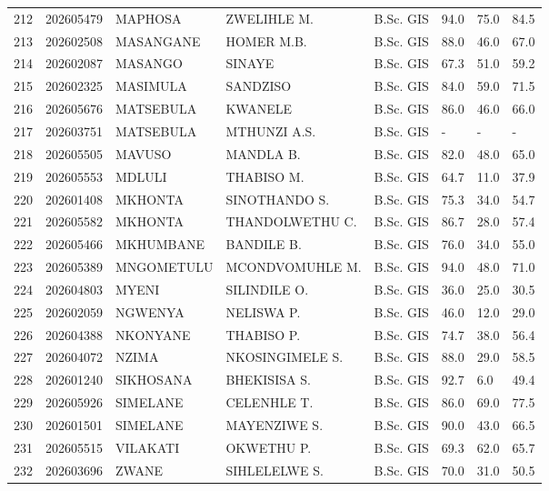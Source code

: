 \documentclass[12pt]{article}
\begin{document}
\begin{longtable}{@{}llllllll@{}}
212 & 202605479 & MAPHOSA & ZWELIHLE M. & B.Sc. GIS & 94.0 & 75.0 & 84.5 \\
213 & 202602508 & MASANGANE & HOMER M.B. & B.Sc. GIS & 88.0 & 46.0 & 67.0 \\
214 & 202602087 & MASANGO & SINAYE & B.Sc. GIS & 67.3 & 51.0 & 59.2 \\
215 & 202602325 & MASIMULA & SANDZISO & B.Sc. GIS & 84.0 & 59.0 & 71.5 \\
216 & 202605676 & MATSEBULA & KWANELE & B.Sc. GIS & 86.0 & 46.0 & 66.0 \\
217 & 202603751 & MATSEBULA & MTHUNZI A.S. & B.Sc. GIS & - & - & - \\
218 & 202605505 & MAVUSO & MANDLA B. & B.Sc. GIS & 82.0 & 48.0 & 65.0 \\
219 & 202605553 & MDLULI & THABISO M. & B.Sc. GIS & 64.7 & 11.0 & 37.9 \\
220 & 202601408 & MKHONTA & SINOTHANDO S. & B.Sc. GIS & 75.3 & 34.0 & 54.7 \\
221 & 202605582 & MKHONTA & THANDOLWETHU C. & B.Sc. GIS & 86.7 & 28.0 & 57.4 \\
222 & 202605466 & MKHUMBANE & BANDILE B. & B.Sc. GIS & 76.0 & 34.0 & 55.0 \\
223 & 202605389 & MNGOMETULU & MCONDVOMUHLE M. & B.Sc. GIS & 94.0 & 48.0 & 71.0 \\
224 & 202604803 & MYENI & SILINDILE O. & B.Sc. GIS & 36.0 & 25.0 & 30.5 \\
225 & 202602059 & NGWENYA & NELISWA P. & B.Sc. GIS & 46.0 & 12.0 & 29.0 \\
226 & 202604388 & NKONYANE & THABISO P. & B.Sc. GIS & 74.7 & 38.0 & 56.4 \\
227 & 202604072 & NZIMA & NKOSINGIMELE S. & B.Sc. GIS & 88.0 & 29.0 & 58.5 \\
228 & 202601240 & SIKHOSANA & BHEKISISA S. & B.Sc. GIS & 92.7 & 6.0 & 49.4 \\
229 & 202605926 & SIMELANE & CELENHLE T. & B.Sc. GIS & 86.0 & 69.0 & 77.5 \\
230 & 202601501 & SIMELANE & MAYENZIWE S. & B.Sc. GIS & 90.0 & 43.0 & 66.5 \\
231 & 202605515 & VILAKATI & OKWETHU P. & B.Sc. GIS & 69.3 & 62.0 & 65.7 \\
232 & 202603696 & ZWANE & SIHLELELWE S. & B.Sc. GIS & 70.0 & 31.0 & 50.5 \\


\end{longtable}
\end{document}
